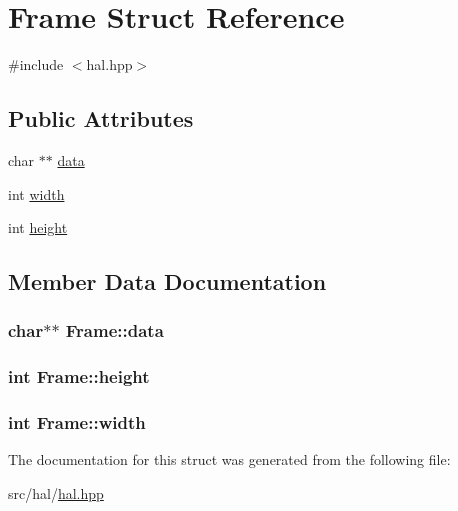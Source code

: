 \hypertarget{struct_frame}{}\section{Frame Struct Reference}
\label{struct_frame}


{\ttfamily \#include $<$hal.\+hpp$>$}

\subsection*{Public Attributes}
\begin{DoxyCompactItemize}
\item 
char $\ast$$\ast$ \hyperlink{struct_frame_ac17e959ecbbeefb3a60f437f38cc7de6}{data}
\item 
int \hyperlink{struct_frame_a04fd6231fc8fe9e75e2f5850c9623ce2}{width}
\item 
int \hyperlink{struct_frame_a9863930f62f48f01c3994cb051d4c2f1}{height}
\end{DoxyCompactItemize}


\subsection{Member Data Documentation}
\subsubsection[{\texorpdfstring{data}{data}}]{\setlength{\rightskip}{0pt plus 5cm}char$\ast$$\ast$ Frame\+::data}\hypertarget{struct_frame_ac17e959ecbbeefb3a60f437f38cc7de6}{}\label{struct_frame_ac17e959ecbbeefb3a60f437f38cc7de6}
\subsubsection[{\texorpdfstring{height}{height}}]{\setlength{\rightskip}{0pt plus 5cm}int Frame\+::height}\hypertarget{struct_frame_a9863930f62f48f01c3994cb051d4c2f1}{}\label{struct_frame_a9863930f62f48f01c3994cb051d4c2f1}
\subsubsection[{\texorpdfstring{width}{width}}]{\setlength{\rightskip}{0pt plus 5cm}int Frame\+::width}\hypertarget{struct_frame_a04fd6231fc8fe9e75e2f5850c9623ce2}{}\label{struct_frame_a04fd6231fc8fe9e75e2f5850c9623ce2}


The documentation for this struct was generated from the following file\+:\begin{DoxyCompactItemize}
\item 
src/hal/\hyperlink{hal_8hpp}{hal.\+hpp}\end{DoxyCompactItemize}
